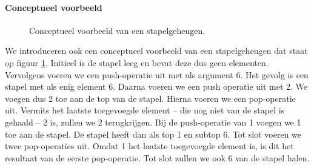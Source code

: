 \paragraph{Conceptueel voorbeeld}
\begin{figure}[hbt]
\centering
{}
\caption{Conceptueel voorbeeld van een stapelgeheugen.}
\label{fig:stackConceptExample}
\end{figure}
We introduceren ook een conceptueel voorbeeld van een stapelgeheugen dat staat op figuur \ref{fig:stackConceptExample}. Initieel is de stapel leeg en bevat deze dus geen elementen. Vervolgens voeren we een push-operatie uit met als argument 6. Het gevolg is een stapel met als enig element 6. Daarna voeren we een push operatie uit met 2. We voegen dus 2 toe aan de top van de stapel. Hierna voeren we een pop-operatie uit. Vermits het laatste toegevoegde element -- die nog niet van de stapel is gehaald -- 2 is, zullen we 2 terugkrijgen. Bij de push-operatie van 1 voegen we 1 toe aan de stapel. De stapel heeft dan als top 1 en subtop 6. Tot slot voeren we twee pop-operaties uit. Omdat 1 het laatste toegevoegde element is, is dit het resultaat van de eerste pop-operatie. Tot slot zullen we ook 6 van de stapel halen.
